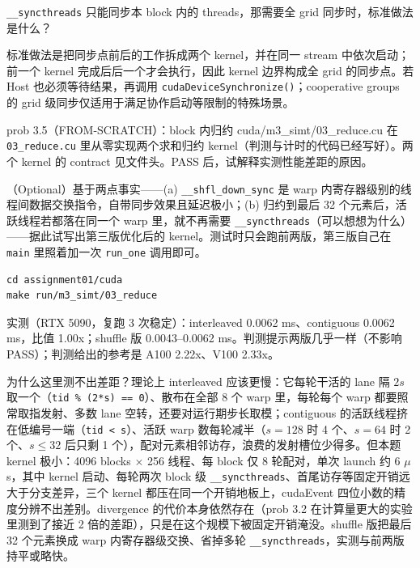 \documentclass[11pt,a4paper,fontset=none]{ctexart}
\begin{document}
\texttt{\_\_syncthreads} 只能同步本 block 内的 threads，那需要全 grid 同步时，标准做法是什么？

标准做法是把同步点前后的工作拆成两个 kernel，并在同一 stream 中依次启动；前一个 kernel 完成后后一个才会执行，因此 kernel 边界构成全 grid 的同步点。若 Host 也必须等待结果，再调用 \texttt{cudaDeviceSynchronize()}；cooperative groups 的 grid 级同步仅适用于满足协作启动等限制的特殊场景。

\begin{capstone}{prob 3.5（FROM-SCRATCH）：block 内归约 \hfill {\footnotesize\ttfamily cuda/m3\_simt/03\_reduce.cu}}
  在 \texttt{03\_reduce.cu} 里从零实现两个求和归约 kernel（判测与计时的代码已经写好）。两个 kernel 的 contract 见文件头。PASS 后，试解释实测性能差距的原因。

  （Optional）基于两点事实——(a) \texttt{\_\_shfl\_down\_sync} 是 warp 内寄存器级别的线程间数据交换指令，自带同步效果且延迟极小；(b) 归约到最后 32 个元素后，活跃线程若都落在同一个 warp 里，就不再需要 \texttt{\_\_syncthreads}（可以想想为什么）——据此试写出第三版优化后的 kernel。测试时只会跑前两版，第三版自己在 \texttt{main} 里照着加一次 \texttt{run\_one} 调用即可。
\end{capstone}

\begin{lstlisting}
cd assignment01/cuda
make run/m3_simt/03_reduce
\end{lstlisting}

实测（RTX 5090，复跑 3 次稳定）：interleaved 0.0062 ms、contiguous 0.0062 ms，比值 1.00x；shuffle 版 0.0043--0.0062 ms。判测提示两版几乎一样（不影响 PASS）；判测给出的参考是 A100 2.22x、V100 2.33x。

为什么这里测不出差距？理论上 interleaved 应该更慢：它每轮干活的 lane 隔 $2s$ 取一个（\texttt{tid \% (2*s) == 0}）、散布在全部 8 个 warp 里，每轮每个 warp 都要照常取指发射、多数 lane 空转，还要对运行期步长取模；contiguous 的活跃线程挤在低编号一端（\texttt{tid < s}）、活跃 warp 数每轮减半（$s=128$ 时 4 个、$s=64$ 时 2 个、$s \le 32$ 后只剩 1 个），配对元素相邻访存，浪费的发射槽位少得多。但本题 kernel 极小：4096 blocks $\times$ 256 线程、每 block 仅 8 轮配对，单次 launch 约 6 $\mu$s，其中 kernel 启动、每轮两次 block 级 \texttt{\_\_syncthreads}、首尾访存等固定开销远大于分支差异，三个 kernel 都压在同一个开销地板上，cudaEvent 四位小数的精度分辨不出差别。divergence 的代价本身依然存在（prob 3.2 在计算量更大的实验里测到了接近 2 倍的差距），只是在这个规模下被固定开销淹没。shuffle 版把最后 32 个元素换成 warp 内寄存器级交换、省掉多轮 \texttt{\_\_syncthreads}，实测与前两版持平或略快。
\end{document}
